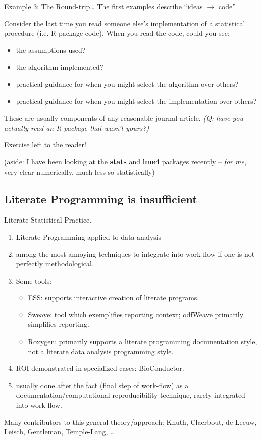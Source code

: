 \documentclass{beamer}
\begin{document}
\begin{frame}{Example 3: The Round-trip\ldots} 
  \label{example3}
  The first examples describe ``ideas $\rightarrow$ code''

  Consider the last time you read someone else's implementation of a
  statistical procedure (i.e. R package code).  When you read the
  code, could you see:
  \begin{itemize}
  \item the assumptions used?
  \item the algorithm implemented?
  \item practical guidance for when you might select the algorithm
    over others? 
  \item practical guidance for when you might select the
    implementation over others? 
  \end{itemize}
  These are usually components of any reasonable journal article.
  \textit{(Q: have you actually read an R package that wasn't yours?)}
\end{frame}

\begin{frame}{Exercise left to the reader!}

  (aside: I have been looking at the \textbf{stats} and \textbf{lme4}
  packages recently -- \textit{for me}, very clear numerically, much
  less so statistically)
\end{frame}



\subsection{Literate Programming is insufficient}

\begin{frame}{Literate Statistical Practice.}
  \begin{enumerate}
  \item Literate Programming applied to data analysis
  \item among the \alert{most annoying} techniques to integrate into
    work-flow if one is not perfectly methodological.
  \item Some tools:
    \begin{itemize}
    \item ESS: supports interactive creation of literate programs.
    \item Sweave: tool which exemplifies reporting context; odfWeave
      primarily simplifies reporting.
    \item Roxygen: primarily supports a literate programming
      documentation style, not a literate data analysis programming
      style. 
  \end{itemize}
  \item ROI demonstrated in specialized cases: BioConductor.
  \item \alert{usually done after the fact} (final step of work-flow)
    as a documentation/computational reproducibility technique, rarely
    integrated into work-flow.
  \end{enumerate}
  Many contributors to this general theory/approach:
  Knuth, Claerbout, de Leeuw, Leisch, Gentleman, Temple-Lang,
  \ldots{}
\end{frame}
\end{document}
